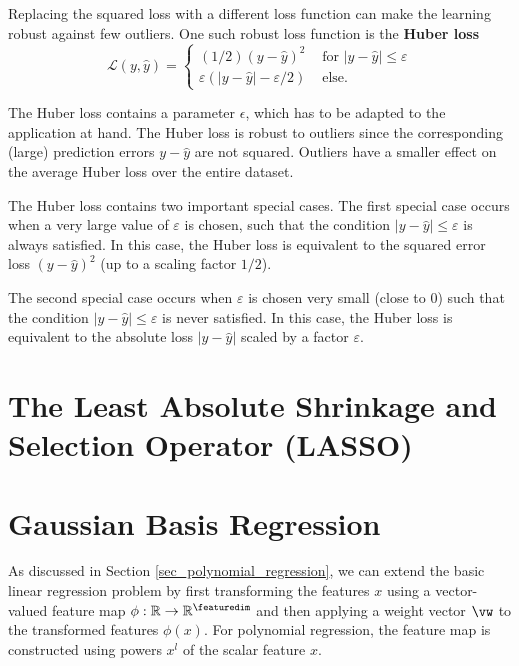 \documentclass[12pt]{report}
\begin{document}
Replacing the squared loss with a different loss function can 
make the learning robust against few outliers. One such robust 
loss function is the {\bf Huber loss} \cite{HuberRobustBook}
\begin{equation}
\mathcal{L}(y,\hat{y}) = \begin{cases} (1/2) (y-\hat{y})^{2} & \mbox{ for } |y-\hat{y}| \leq   \varepsilon \\ 
\varepsilon(|y-\hat{y}| - \varepsilon/2) & \mbox{ else. }\end{cases}
\end{equation}

The Huber loss contains a parameter $\epsilon$, which has to 
be adapted to the application at hand. The Huber loss is robust 
to outliers since the corresponding (large) prediction errors 
$y - \hat{y}$ are not squared. Outliers have a smaller effect 
on the average Huber loss over the entire dataset. 

The Huber loss contains two important special cases. 
The first special case occurs when a very large value of $\varepsilon$ 
is chosen, such that the condition $|y-\hat{y}| \leq \varepsilon$ is 
always satisfied. In this case, the Huber loss is equivalent to the 
squared error loss $(y-\hat{y})^{2}$ (up to a scaling factor $1/2$). 

The second special case occurs when $\varepsilon$ is chosen 
very small (close to $0$) such that the condition $|y-\hat{y}| \leq \varepsilon$ 
is never satisfied. In this case, the Huber loss is equivalent 
to the absolute loss $|y - \hat{y}|$ scaled by a factor $\varepsilon$.

\section{The Least Absolute Shrinkage and Selection Operator (LASSO)}
\label{sec_lasoo}

\section{Gaussian Basis Regression}
\label{sec_linbasreg}
As discussed in Section \ref{sec_polynomial_regression}, we can 
extend the basic linear regression problem by first transforming 
the features $x$ using a vector-valued feature map $\phi: \mathbb{R} \rightarrow \mathbb{R}^{\featuredim}$ 
and then applying a weight vector $\vw$ to the transformed 
features $\phi(x)$. For polynomial regression, the feature map 
is constructed using powers $x^{l}$ of the scalar feature $x$. 
\end{document}
